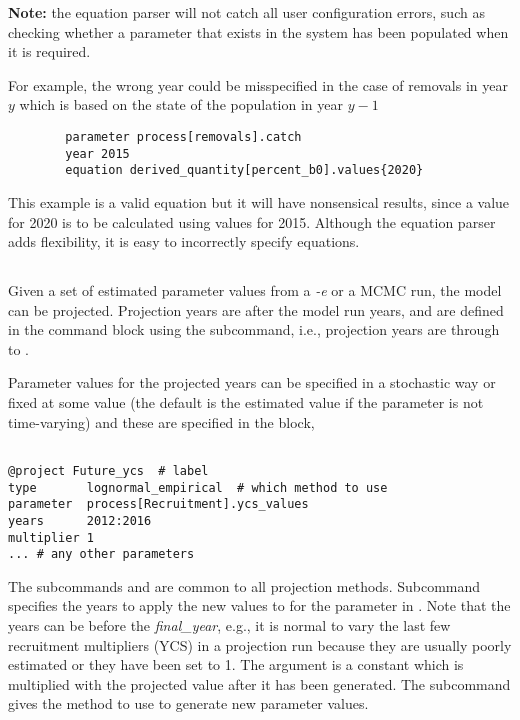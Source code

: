 \textbf{Note:} the equation parser will not catch all user configuration errors, such as checking whether a parameter that exists in the system has been populated when it is required.

For example, the wrong year could be misspecified in the case of removals in year $y$ which is based on the state of the population in year $y-1$

{\small{\begin{verbatim}
		parameter process[removals].catch
		year 2015
		equation derived_quantity[percent_b0].values{2020}
\end{verbatim}}}

This example is a valid equation but it will have nonsensical results, since a value for 2020 is to be calculated using values for 2015. Although the equation parser adds flexibility, it is easy to incorrectly specify equations.

\subsection{}\label{sec:Project}

Given a set of estimated parameter values from a \textit{-e} or a MCMC run,
the model can be projected. Projection years are after the model run years, and are defined in the  command block using the  subcommand, i.e., projection years are  through to .

Parameter values for the projected years can be specified in a stochastic way or fixed at some value (the default is the estimated value if the parameter is not time-varying) and these are specified in the  block,

{\small{\begin{verbatim}

@project Future_ycs  # label
type       lognormal_empirical  # which method to use
parameter  process[Recruitment].ycs_values
years      2012:2016
multiplier 1
... # any other parameters
\end{verbatim}}}

The subcommands  and  are common to all projection methods. Subcommand  specifies the years to apply the new values to for the parameter in . Note that the years can be before the \textit{final\_year}, e.g., it is normal to vary the last few recruitment multipliers (YCS) in a projection run because they are usually poorly estimated or they have been set to 1.  The argument  is a constant which is multiplied with the projected value after it has been generated. The  subcommand gives the method to use to generate new parameter values.

